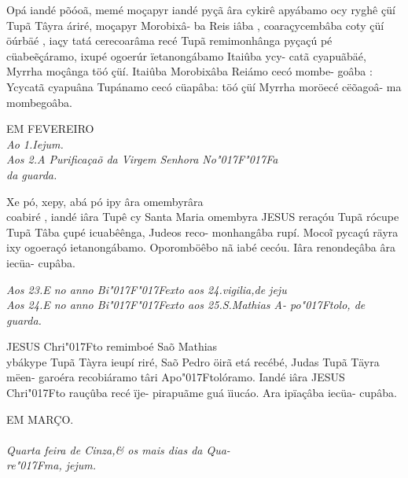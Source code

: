 \documentclass[openany,titlepage,12pt]{book}
\newcommand{\lgS}{\char"017F}
\newcommand{\lgSS}{\char"017F\char"017F}
\begin{document}
{Opá iandé põóoã, memé moçapyr iandé
pyçã âra cykirê apyábamo ocy ryghê çüí\linebreak
Tupã Tâyra áriré, moçapyr Morobixâ-\linebreak
ba Reis iâba , coaraçycembâba coty çüí\linebreak
öúrbäé , iaçy tatá cerecoarâma recé Tupã
remimonhânga pyçaçú pé cüabe\~eçáramo,
ixupé ogoerúr ïetanongábamo Itaiûba ycy-
catã cyapuãbäé, Myrrha moçânga töó çüí.
Itaiûba Morobixâba Reiámo cecó mombe-
goâba : Ycycatã cyapuâna Tupánamo cecó
cüapâba: töó çüí Myrrha moröecé cëõagoâ-
ma mombegoâba.}
\unskip\vspace*{-1ex}
\begin{center}
    {EM FEVEREIRO\\}
    \textit{\small Ao 1.Iejum.\\
    Aos 2.A Purificaçaõ da Virgem Senhora No\lgSS a\\
    da guarda.}
\end{center}
\unskip
{\hspace*{2ex}Xe pó, xepy, abá pó ipy âra omembyrâra\\
coabiré , iandé iâra Tupê cy Santa Maria
omembyra JESUS reraçóu Tupã rócupe\linebreak
Tupã Tâba çupé icuabêênga, Judeos reco-
monhangâba rupí. Moco\~i pycaçú räyra ixy
ogoeraçó ietanongábamo. Oporomböêbo
nã iabé cecóu. Iâra renondeçâba âra iecüa-
cupâba.}
\unskip
\begin{center}
    \textit{\small Aos 23.E no anno Bi\lgSS exto aos 24.vigilia,de jeju\\
    Aos 24.E no anno Bi\lgSS exto aos 25.S.Mathias A-\linebreak
    \hspace*{-17ex}po\lgS tolo, de guarda.}
\end{center}
\unskip
{\hspace*{2ex}JESUS Chri\lgS to  remimboé Saõ Mathias\\
ybákype Tupã Tàyra ieupí riré, Saõ Pedro\linebreak
öirã etá recébé, Judas Tupã Täyra mëen-\linebreak
garoéra recobiáramo târi Apo\lgS tolóramo.\linebreak
Iandé iâra JESUS Chri\lgS to  rauçûba recé ïje-
pirapuãme guá ïiucáo. Ara ipïaçâba iecüa-
cupâba.
}

\begin{center}
    {EM MARÇO.\\}
    \textit{\small \\Quarta feira de Cinza,\& os mais dias da Qua-\\
    re\lgS ma, jejum.}
\end{center}
\end{document}
